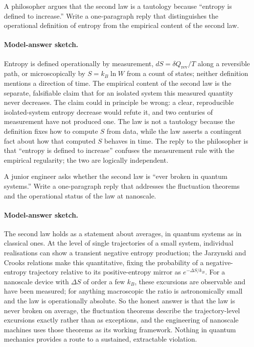 \begin{exercise}
A philosopher argues that the second law is a tautology because
``entropy is defined to increase.'' Write a one-paragraph reply that
distinguishes the operational definition of entropy from the
empirical content of the second law.

\paragraph{Model-answer sketch.} Entropy is defined operationally by
measurement, $dS = \delta Q_{\text{rev}}/T$ along a reversible path, or
microscopically by $S = k_B \ln W$ from a count of states; neither
definition mentions a direction of time. The empirical content of the
second law is the separate, falsifiable claim that for an isolated
system this measured quantity never decreases. The claim could in
principle be wrong: a clear, reproducible isolated-system entropy
decrease would refute it, and two centuries of measurement have not
produced one. The law is not a tautology because the definition fixes
how to compute $S$ from data, while the law asserts a contingent fact
about how that computed $S$ behaves in time. The reply to the
philosopher is that ``entropy is defined to increase'' confuses the
measurement rule with the empirical regularity; the two are logically
independent.
\end{exercise}

\begin{exercise}
A junior engineer asks whether the second law is ``ever broken in
quantum systems.'' Write a one-paragraph reply that addresses the
fluctuation theorems and the operational status of the law at
nanoscale.

\paragraph{Model-answer sketch.} The second law holds as a statement
about averages, in quantum systems as in classical ones. At the level
of single trajectories of a small system, individual realisations can
show a transient negative entropy production; the Jarzynski and Crooks
relations make this quantitative, fixing the probability of a
negative-entropy trajectory relative to its positive-entropy mirror as
$e^{-\Delta S/k_B}$. For a nanoscale device with $\Delta S$ of order a
few $k_B$, these excursions are observable and have been measured; for
anything macroscopic the ratio is astronomically small and the law is
operationally absolute. So the honest answer is that the law is never
broken on average, the fluctuation theorems describe the trajectory-level
excursions exactly rather than as exceptions, and the engineering of
nanoscale machines uses those theorems as its working framework. Nothing
in quantum mechanics provides a route to a sustained, extractable
violation.
\end{exercise}
